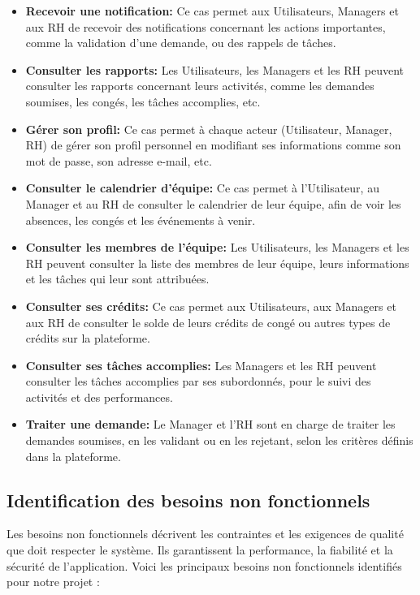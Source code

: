 \begin{itemize}
 \item \textbf{Recevoir une notification:} Ce cas permet aux Utilisateurs, Managers et aux RH de recevoir des notifications concernant les actions importantes, comme la validation d’une demande, ou des rappels de tâches.

 \item \textbf{Consulter les rapports:} Les Utilisateurs, les Managers et les RH peuvent consulter les rapports concernant leurs activités, comme les demandes soumises, les congés, les tâches accomplies, etc.

 \item \textbf{Gérer son profil:} Ce cas permet à chaque acteur (Utilisateur, Manager, RH) de gérer son profil personnel en modifiant ses informations comme son mot de passe, son adresse e-mail, etc.

 \item \textbf{Consulter le calendrier d'équipe:} Ce cas permet à l'Utilisateur, au Manager et au RH de consulter le calendrier de leur équipe, afin de voir les absences, les congés et les événements à venir.
\newpage
 \item \textbf{Consulter les membres de l'équipe:} Les Utilisateurs, les Managers et les RH peuvent consulter la liste des membres de leur équipe, leurs informations et les tâches qui leur sont attribuées.\\

 \item \textbf{Consulter ses crédits:} Ce cas permet aux Utilisateurs, aux Managers et aux RH de consulter le solde de leurs crédits de congé ou autres types de crédits sur la plateforme.

 \item \textbf{Consulter ses tâches accomplies:} Les Managers et les RH peuvent consulter les tâches accomplies par ses subordonnés, pour le suivi des activités et des performances.

 \item \textbf{Traiter une demande:} Le Manager  et l'RH sont en charge de traiter les demandes soumises, en les validant ou en les rejetant, selon les critères définis dans la plateforme.
\end{itemize}
\subsection{Identification des besoins non fonctionnels}

Les besoins non fonctionnels décrivent les contraintes et les exigences de qualité que doit respecter le système. Ils garantissent la performance, la fiabilité et la sécurité de l'application. Voici les principaux besoins non fonctionnels identifiés pour notre projet :

